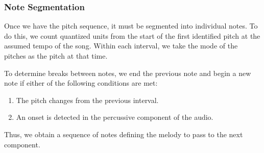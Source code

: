 \subsubsection{Note Segmentation}

Once we have the pitch sequence, it must be segmented into individual notes. To do this, we count quantized units from the start of the first identified pitch at the assumed tempo of the song. Within each interval, we take the mode of the pitches as the pitch at that time.

To determine breaks between notes, we end the previous note and begin a new note if either of the following conditions are met:

\begin{enumerate}
    \item The pitch changes from the previous interval.
    \item An onset is detected in the percussive component of the audio.
\end{enumerate}

Thus, we obtain a sequence of notes defining the melody to pass to the next component.
